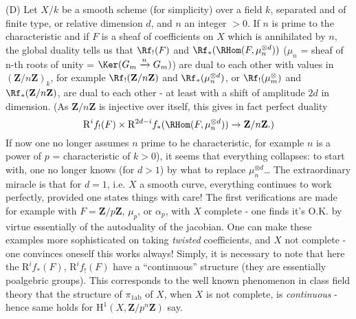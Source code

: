 \label{sec:app12}%
(D) Let $X/k$ be a smooth scheme (for simplicity) over a field $k$, separated and of finite type, or relative dimension $d$, and $n$ an integer $> 0$. If $n$ is prime to the characteristic and if $F$ is a sheaf of coefficients on $X$ which is annihilated by $n$, the global duality tells us that $\Rf_!(F)$ and $\Rf_*(\RHom(F, \mu_n^{\otimes d}))$ ($\mu_n$ = sheaf of n-th roots of unity = $\Ker(G_m \xrightarrow{n} G_m)$) are dual to each other with values in $(\mathbf{Z}/n\mathbf{Z})_k$, for example $\Rf_!(\mathbf{Z}/n\mathbf{Z})$ and $\Rf_*(\mu_n^{\otimes d})$, or $\Rf_!(\mu^{\otimes}_m)$ and $\Rf_*(\mathbf{Z}/n\mathbf{Z})$, are dual to each other - at least with a shift of amplitude $2d$ in dimension. (As $\mathbf{Z}/n\mathbf{Z}$ is injective over itself, this gives in fact perfect duality
    $$
    \mathrm{R}^if_!(F) \times \mathrm{R}^{2d-i}f_*(\RHom(F, \mu_n^{\otimes d})) \to \mathbf{Z}/n\mathbf{Z}.)
    $$
    If now one no longer assumes $n$ prime to he characteristic, for example $n$ is a power of $p$ = characteristic of $k > 0$), it seems that everything collapses: to start with, one no longer knows (for $d > 1$) by what to replace $\mu_n^{\otimes d}$\dots
The extraordinary miracle is that for $d = 1$, i.e. $X$ a smooth curve, everything continues to work perfectly, provided one states things with care! The first verifications are made for example with $F = \mathbf{Z}/p\mathbf{Z}$, $\mu_p$, or $\alpha_p$, with $X$ complete - one finds it's O.K. by virtue essentially of the autoduality of the jacobian. One can make these examples more sophisticated on taking \emph{twisted} coefficients, and $X$ not complete - one convinces oneself this works always! Simply, it is necessary to note that here the $\mathrm{R}^if_*(F)$, $\mathrm{R}^if_!(F)$ have a ``continuous'' structure (they are essentially poalgebric groups). This corresponds to the well known phenomenon in class field theory that the structure of $\pi_{1\text{ab}}$ of $X$, when $X$ is not complete, is \emph{continuous} - hence same holds for $\mathrm{H}^1(X, \mathbf{Z}/p^n\mathbf{Z})$ say.

